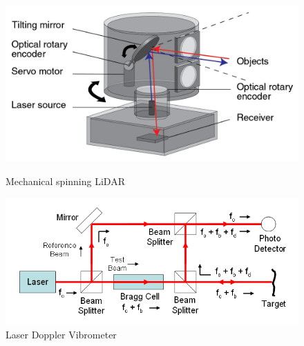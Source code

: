 \documentclass[sigconf, nonacm]{acmart}
\begin{document}
\begin{figure}[H]
\centering
\includegraphics[width=\linewidth]{embed/Lidar_scanner.jpg}
\caption{Mechanical spinning LiDAR \cite{RenishawLidar}}
\label{fig:LiDAR}

\vspace{0.5cm}

\includegraphics[width=\linewidth]{embed/Laser_Doppler_Vibrometer.png}
\caption{Laser Doppler Vibrometer \cite{WikipediaLDV}}
\label{fig:LDV}
\end{figure}
\end{document}
